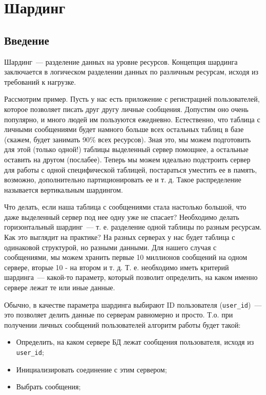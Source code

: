 \chapter{Шардинг}

\begin{epigraphs}
\end{epigraphs}

\section{Введение}

Шардинг~--- разделение данных на уровне ресурсов. Концепция шардинга заключается в логическом разделении данных по различным ресурсам, исходя из требований к нагрузке.

Рассмотрим пример. Пусть у нас есть приложение с регистрацией пользователей, которое позволяет писать друг другу личные сообщения. Допустим оно очень популярно, и много людей им пользуются ежедневно. Естественно, что таблица с личными сообщениями будет намного больше всех остальных таблиц в базе (скажем, будет занимать 90\% всех ресурсов). Зная это, мы можем подготовить для этой (только одной!) таблицы выделенный сервер помощнее, а остальные оставить на другом (послабее). Теперь мы можем идеально подстроить сервер для работы с одной специфической таблицей, постараться уместить ее в память, возможно, дополнительно партиционировать ее и т. д. Такое распределение называется вертикальным шардингом.

Что делать, если наша таблица с сообщениями стала настолько большой, что даже выделенный сервер под нее одну уже не спасает? Необходимо делать горизонтальный шардинг~--- т. е. разделение одной таблицы по разным ресурсам. Как это выглядит на практике? На разных серверах у нас будет таблица с одинаковой структурой, но разными данными. Для нашего случая с сообщениями, мы можем хранить первые 10 миллионов сообщений на одном сервере, вторые 10 - на втором и т. д. Т. е. необходимо иметь критерий шардинга~--- какой-то параметр, который позволит определить, на каком именно сервере лежат те или иные данные.

Обычно, в качестве параметра шардинга выбирают ID пользователя (\lstinline!user_id!)~--- это позволяет делить данные по серверам равномерно и просто. Т.о. при получении личных сообщений пользователей алгоритм работы будет такой:

\begin{itemize}
  \item Определить, на каком сервере БД лежат сообщения пользователя, исходя из \lstinline!user_id!;
  \item Инициализировать соединение с этим сервером;
  \item Выбрать сообщения;
\end{itemize}

